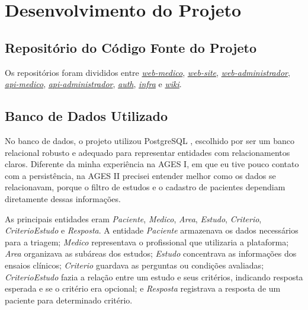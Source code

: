 \section[Desenvolvimento do Projeto]{Desenvolvimento do Projeto}

\subsection{Repositório do Código Fonte do Projeto}
  Os repositórios foram divididos entre \href{https://tools.ages.pucrs.br/let-me-trial/webmedico}{\textit{web-medico}}, \href{https://tools.ages.pucrs.br/let-me-trial/web-site}{\textit{web-site}}, \href{https://tools.ages.pucrs.br/let-me-trial/webadministrador}{\textit{web-administrador}}, \href{https://tools.ages.pucrs.br/let-me-trial/api-medico}{\textit{api-medico}}, \href{https://tools.ages.pucrs.br/let-me-trial/api-administrador}{\textit{api-administrador}}, \href{https://tools.ages.pucrs.br/let-me-trial/api-auth}{\textit{auth}}, \href{https://tools.ages.pucrs.br/let-me-trial/infra}{\textit{infra}} e \href{https://tools.ages.pucrs.br/let-me-trial/wiki}{\textit{wiki}}.

\subsection{Banco de Dados Utilizado}
No banco de dados, o projeto utilizou PostgreSQL \cite{postgresql}, escolhido por ser um banco relacional robusto e adequado para representar entidades com relacionamentos claros. Diferente da minha experiência na AGES I, em que eu tive pouco contato com a persistência, na AGES II precisei entender melhor como os dados se relacionavam, porque o filtro de estudos e o cadastro de pacientes dependiam diretamente dessas informações.

As principais entidades eram \textit{Paciente}, \textit{Medico}, \textit{Area}, \textit{Estudo}, \textit{Criterio}, \textit{CriterioEstudo} e \textit{Resposta}. A entidade \textit{Paciente} armazenava os dados necessários para a triagem; \textit{Medico} representava o profissional que utilizaria a plataforma; \textit{Area} organizava as subáreas dos estudos; \textit{Estudo} concentrava as informações dos ensaios clínicos; \textit{Criterio} guardava as perguntas ou condições avaliadas; \textit{CriterioEstudo} fazia a relação entre um estudo e seus critérios, indicando resposta esperada e se o critério era opcional; e \textit{Resposta} registrava a resposta de um paciente para determinado critério.

